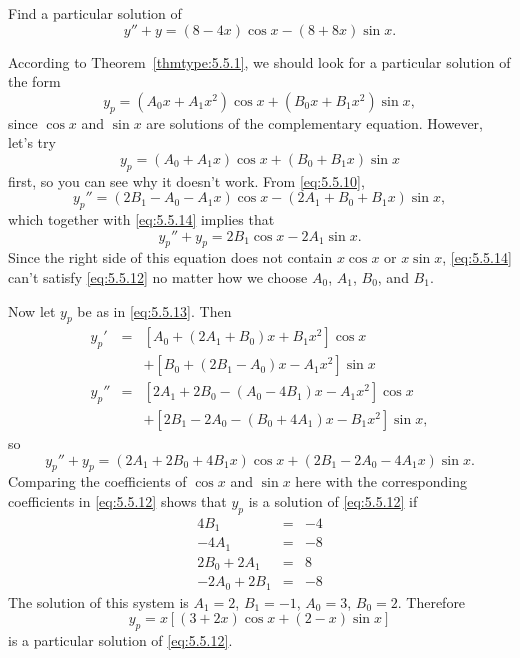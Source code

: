 \documentclass{ximera}
\begin{document}
\begin{example}\label{example:5.5.4}
Find a particular solution of
\begin{equation} \label{eq:5.5.12}
y''+y=(8-4x)\cos x-(8+8x)\sin x.
\end{equation}

\begin{explanation}
According to  Theorem~\ref{thmtype:5.5.1}, we should look for a
particular solution of the form
\begin{equation} \label{eq:5.5.13}
y_p=(A_0x+A_1x^2)\cos x+(B_0x+B_1x^2)\sin x,
\end{equation}
since $\cos x$ and $\sin x$ are solutions of the complementary
equation. However, let's  try
\begin{equation} \label{eq:5.5.14}
y_p=(A_0+A_1x)\cos x+(B_0+B_1x)\sin x
\end{equation}
first, so you can see why it doesn't work. From \eqref{eq:5.5.10},
$$
 y_p''=(2B_1-A_0-A_1x)\cos x-(2A_1+B_0+B_1x)\sin x,
$$
which together with \eqref{eq:5.5.14} implies that
$$
y_p''+y_p=2B_1\cos x-2A_1\sin x.
$$
Since the right side of this equation does not contain $x\cos x$
or $x\sin x$,  \eqref{eq:5.5.14} can't satisfy
\eqref{eq:5.5.12} no matter how we choose $A_0$, $A_1$, $B_0$, and $B_1$.

Now let $y_p$ be as in \eqref{eq:5.5.13}. Then
\begin{eqnarray*}
y_p'&=&\left[A_0+(2A_1+B_0)x+B_1x^2\right]\cos x\\ &&
+\left[B_0+(2B_1-A_0)x-A_1x^2\right]\sin x\\  
y_p''&=&
\left[2A_1+2B_0-(A_0-4B_1)x-A_1x^2\right]\cos x\\ &&+
\left[2B_1-2A_0-(B_0+4A_1)x-B_1x^2\right]\sin x,
\end{eqnarray*}
so
$$
y_p''+y_p=(2A_1+2B_0+4B_1x)\cos x+(2B_1-2A_0-4A_1x)\sin x.
$$
Comparing the  coefficients of $\cos x$ and
$\sin x$ here  with the corresponding coefficients  in \eqref{eq:5.5.12}
shows that
$y_p$ is a solution of \eqref{eq:5.5.12} if
$$
\begin{array}{rcr}
4B_1&=&-4\\
-4A_1&=&-8\\
2B_0+2A_1&=&8\\
-2A_0+2B_1&=&-8
\end{array}
$$
The solution of this system is  $A_1=2$, $B_1=-1$, $A_0=3$, $B_0=2$.
  Therefore
$$
y_p=x\left[(3+2x)\cos x+(2-x)\sin x\right]
$$
is a particular solution of \eqref{eq:5.5.12}.
\end{explanation}
\end{example}
\end{document}
